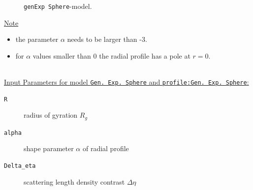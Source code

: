 \begin{figure}[htb]
\captionsetup[subfigure]{position=b}
\centering
{}
\hfill
{}
\caption{\texttt{genExp Sphere}-model.}
\label{fig:genExpprofile}
\end{figure}

\noindent
\uline{Note}
\begin{itemize}
  \item the parameter $\alpha$ needs to be larger than -3.
  \item for $\alpha$ values smaller than 0 the radial profile has a pole at $r=0$.
\end{itemize}

\hspace{1pt}\\
\uline{Input Parameters for model \texttt{Gen. Exp. Sphere} and \texttt{profile:Gen. Exp.  Sphere}:}
\begin{description}
\item[\texttt{R}] radius of gyration $R_g$
\item[\texttt{alpha}] shape parameter $\alpha$ of radial profile
\item[\texttt{Delta\_eta}] scattering length density contrast $\Delta\eta$
\end{description}


